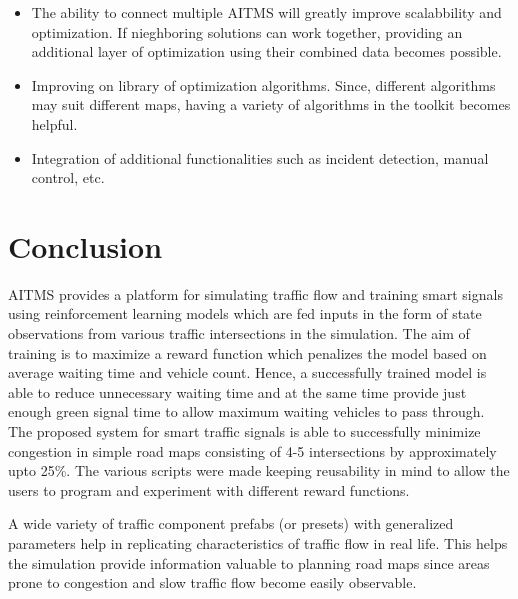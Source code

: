 \documentclass[openany,12pt]{report}
\begin{document}
	\begin{itemize}
		\item{The ability to connect multiple AITMS will greatly improve scalabbility and optimization. If nieghboring solutions can work together, providing an additional layer of optimization using their combined data becomes possible.}
		\item{Improving on library of optimization algorithms. Since, different algorithms may suit different maps, having a variety of algorithms in the toolkit becomes helpful.}
		\item{Integration of additional functionalities such as incident detection, manual control, etc.}
	\end{itemize}
	
	\chapter{Conclusion}
	\hspace*{0.5in}AITMS provides a platform for simulating traffic flow and training smart signals using reinforcement learning models which are fed inputs in the form of state observations from various traffic intersections in the simulation. The aim of training is to maximize a reward function which penalizes the model based on average waiting time and vehicle count. Hence, a successfully trained model is able to reduce unnecessary waiting time and at the same time provide just enough green signal time to allow maximum waiting vehicles to pass through. The proposed system for smart traffic signals is able to successfully minimize congestion in simple road maps consisting of 4-5 intersections by approximately upto 25\%. The various scripts were made keeping reusability in mind to allow the users to program and experiment with different reward functions.

	\hspace*{0.5in}A wide variety of traffic component prefabs (or presets) with generalized parameters help in replicating characteristics of traffic flow in real life. This helps the simulation provide information valuable to planning road maps since areas prone to congestion and slow traffic flow become easily observable.
\end{document}
